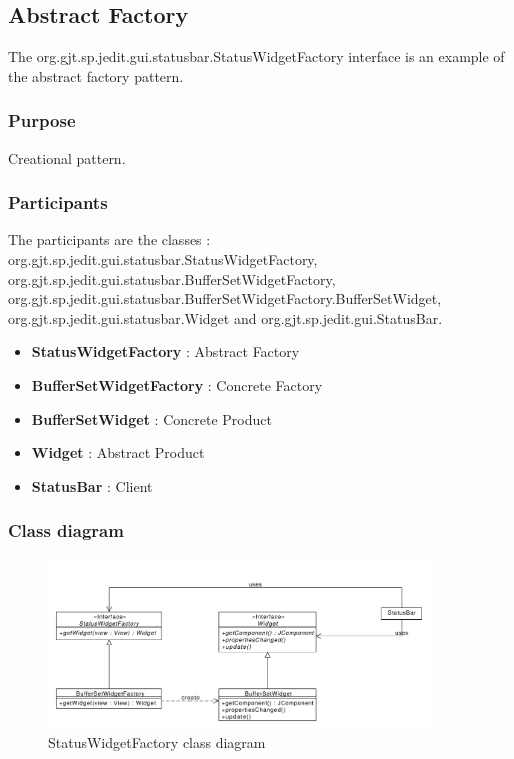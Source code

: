 \documentclass[a4paper,10pt]{article}
\begin{document}
\subsection{Abstract Factory}
The org.gjt.sp.jedit.gui.statusbar.StatusWidgetFactory interface is an example of the abstract factory pattern.

\subsubsection{Purpose}
Creational pattern.
\subsubsection[Participants]{Participants\footnotemark[1]}
The participants are the classes : org.gjt.sp.jedit.gui.statusbar.StatusWidgetFactory, org.gjt.sp.jedit.gui.statusbar.BufferSetWidgetFactory, org.gjt.sp.jedit.gui.statusbar.BufferSetWidgetFactory.BufferSetWidget, org.gjt.sp.jedit.gui.statusbar.Widget and org.gjt.sp.jedit.gui.StatusBar.

\begin{itemize}
 \item \textbf{StatusWidgetFactory} : Abstract Factory
 \item \textbf{BufferSetWidgetFactory} : Concrete Factory
 \item \textbf{BufferSetWidget} : Concrete Product
 \item \textbf{Widget} : Abstract Product
 \item \textbf{StatusBar} : Client
\end{itemize}

\subsubsection{Class diagram}
\begin{center}
\begin{figure}[h]
  \centerline{\includegraphics[width=0.9\textwidth]{abstractfactory-statuswidgetfactory-class-diagram.pdf}}
  \caption{StatusWidgetFactory class diagram}
\end{figure}
\end{center}
\end{document}
